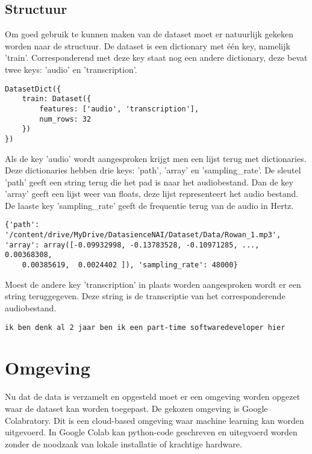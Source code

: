 \subsection{Structuur}
Om goed gebruik te kunnen maken van de dataset moet er natuurlijk gekeken worden naar de structuur. De dataset is een dictionary met één key, namelijk 'train'. Corresponderend met deze key staat nog een andere dictionary, deze bevat twee keys: 'audio' en 'transcription'. 
\begin{listing}[H]
    \begin{verbatim}
DatasetDict({
    train: Dataset({
        features: ['audio', 'transcription'],
        num_rows: 32
    })
})
    \end{verbatim}
\caption{Dataset structuur die wordt weergegeven wanneer er \emph{print(dataset)} wordt uitgevoerd.}
\end{listing}
Als de key 'audio' wordt aangesproken krijgt men een lijst terug met dictionaries. Deze dictionaries hebben drie keys: 'path', 'array' en 'sampling\_rate'. De sleutel 'path' geeft een string terug die het pad is naar het audiobestand. Dan de key 'array' geeft een lijst weer van floats, deze lijst representeert het audio bestand. De laaste key 'sampling\_rate' geeft de frequentie terug van de audio in Hertz.
\begin{listing}[H]
    \begin{verbatim}
{'path': '/content/drive/MyDrive/DatasienceNAI/Dataset/Data/Rowan_1.mp3', 'array': array([-0.09932998, -0.13783528, -0.10971285, ...,  0.00368308,
    0.00385619,  0.0024402 ]), 'sampling_rate': 48000}
    \end{verbatim}
    \caption{Structuur van dictionary in de lijst, dit wordt weergegeven wanneer \emph{print(dataset['train']['audio'][0])} wordt uitgevoerd.}
\end{listing}
Moest de andere key 'transcription' in plaats worden aangesproken wordt er een string teruggegeven. Deze string is de transcriptie van het corresponderende audiobestand.
\begin{listing}[H]
    \begin{verbatim}
ik ben denk al 2 jaar ben ik een part-time softwaredeveloper hier
    \end{verbatim}
    \caption{Wat er wordt weergegeven wanneer \emph{print(dataset['train']['transcription'][0])} wordt uitgevoerd.}
\end{listing}
\section{Omgeving}
Nu dat de data is verzamelt en opgesteld moet er een omgeving worden opgezet waar de dataset kan worden toegepast. De gekozen omgeving is Google Colabratory. Dit is een cloud-based omgeving waar machine learning kan worden uitgevoerd. In Google Colab kan python-code geschreven en uitegvoerd worden zonder de noodzaak van lokale installatie of krachtige hardware.

